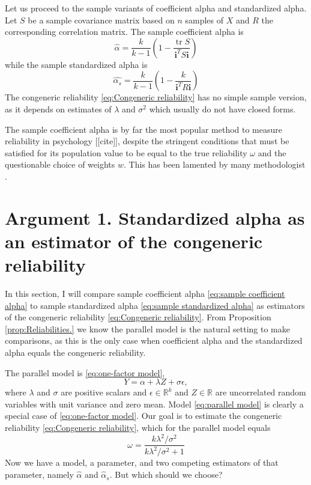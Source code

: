 \documentclass{article}
\theoremstyle{plain}
\theoremstyle{plain}
\theoremstyle{definition}
\theoremstyle{remark}
\theoremstyle{definition}
\theoremstyle{plain}
\theoremstyle{plain}
\theoremstyle{definition}
\DeclareMathOperator{\tr}{tr}
\begin{document}
Let us proceed to the sample variants of coefficient alpha and standardized
alpha. Let $S$ be a sample covariance matrix based on
$n$ samples of $X$ and $R$ the corresponding correlation matrix.
The sample coefficient alpha is 
\begin{equation}
\widehat{\alpha}=\frac{k}{k-1}\left(1-\frac{\tr{S}}{\mathbf{i}^{T}S\mathbf{i}}\right)\label{eq:sample coefficient alpha}
\end{equation}
while the sample standardized alpha is
\begin{equation}
\widehat{\alpha_s}=\frac{k}{k-1}\left(1-\frac{k}{\mathbf{i}^{T}R\mathbf{i}}\right)\label{eq:sample standardized alpha}
\end{equation}
The congeneric reliability \eqref{eq:Congeneric reliability} has no
simple sample version, as it depends on estimates of $\lambda$ and
$\sigma^{2}$ which usually do not have closed forms.

The sample coefficient alpha is by far the most popular method to
measure reliability in psychology [[cite]], despite the stringent conditions
that must be satisfied for its population value to be equal to the
true reliability $\omega$ and the questionable choice of weights $w$. This has been lamented by
many methodologist \citep[see e.g.][]{McNeish2018-vu,hancock2001rethinking, McNeish2019-ea}.

\section{Argument 1. Standardized alpha as an estimator of the congeneric reliability}

In this section, I will compare sample coefficient alpha \eqref{eq:sample coefficient alpha} to sample standardized alpha \eqref{eq:sample standardized alpha} as estimators of the congeneric reliability \eqref{eq:Congeneric reliability}. From Proposition \ref{prop:Reliabilities.} we know the parallel model is the natural setting to make comparisons, as this is the only case when coefficient alpha and the standardized alpha equals the congeneric reliability.

The parallel model is
\eqref{eq:one-factor model},
\begin{equation}
\label{eq:parallel model}
Y = \alpha + \lambda Z + \sigma\epsilon,
\end{equation}
where $\lambda$ and $\sigma$ are positive scalars and $\epsilon\in\mathbb{R}^k$ and $Z\in\mathbb{R}$ are uncorrelated random variables with unit variance and zero mean. Model \eqref{eq:parallel model} is clearly a special case of \eqref{eq:one-factor model}. Our goal is to estimate the congeneric reliability \eqref{eq:Congeneric reliability}, which for the parallel model equals
\begin{equation}
\label{eq:parallel_omega}
\omega = \frac{k\lambda^2/\sigma^2}{k\lambda^2/\sigma^2 + 1}
\end{equation}
Now we have a model, a parameter, and two competing estimators of that parameter, namely $\widehat{\alpha}$ and $\widehat{\alpha}_s$. But which should we choose? 
\end{document}
